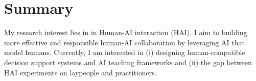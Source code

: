 
\section{Summary}




My research interest lies in in Human-AI interaction (HAI). I aim to building more effective and responsible human-AI collaboration by leveraging AI that model humans. Currently, I am interested in (i) designing human-compatible decision support systems and AI teaching frameworks and (ii) the gap between HAI experiments on laypeople and practitioners.



